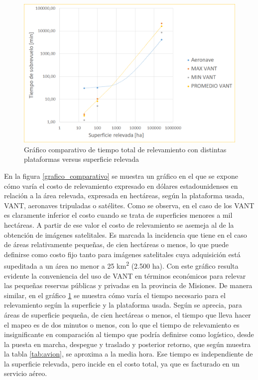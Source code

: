 \begin{figure}[h!]
    \includegraphics[width=\textwidth]{Imagenes/grafico bloque 1-II.png}
     \hfill
     \caption{Gráfico comparativo de tiempo total de relevamiento con distintas plataformas versus superficie relevada}
    \label{grafico_comparativo-II}
\end{figure}

En la figura \ref{grafico_comparativo} se muestra un gráfico en el que se expone cómo varía el costo de relevamiento expresado en dólares estadounidenses en relación a la área relevada, expresada en hectáreas, según la plataforma usada, VANT, aeronaves tripuladas o satélites. Como se observa, en el caso de los VANT es claramente inferior el costo cuando se trata de superficies menores a mil hectáreas. A partir de ese valor el costo de relevamiento se asemeja al de la obtención de imágenes satelitales. Es marcada la incidencia que tiene en el caso de áreas relativamente pequeñas, de cien hectáreas o menos, lo que puede definirse como costo fijo tanto para imágenes satelitales cuya adquisición está supeditada a un área no menor a 25 km\textsuperscript{2} (2.500 ha). Con este gráfico resulta evidente la conveniencia del uso de VANT en términos económicos para relevar las pequeñas reservas públicas y privadas en la provincia de Misiones. De manera similar, en el gráfico \ref{grafico_comparativo-II} se muestra cómo varía el tiempo necesario para el relevamiento según la superficie y la plataforma usada. Según se aprecia, para áreas de superficie pequeña, de cien hectáreas o menos, el tiempo que lleva hacer el mapeo es de dos minutos o menos, con lo que el tiempo de relevamiento es insignificante en comparación al tiempo que podría definirse como logístico, desde la puesta en marcha, despegue y traslado y posterior retorno, que según muestra la tabla \ref{tab:avion}, se aproxima a la media hora. Ese tiempo es independiente de la superficie relevada, pero incide en el costo total, ya que es facturado en un servicio aéreo. 

